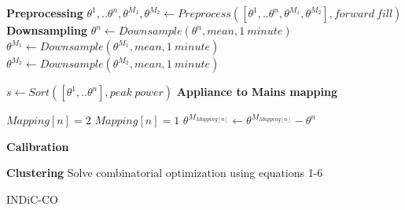 \documentclass[conference]{IEEEtran}
\begin{document}
\begin{algorithm}
\DontPrintSemicolon %
\BlankLine
\textbf{Preprocessing}\;
\BlankLine
\nl$\theta^1,..\theta^n,\theta^{M_1},\theta^{M_2} \gets Preprocess([\theta^1,..\theta^n,\theta^{M_1},\theta^{M_2}],forward\: fill)$\;
\BlankLine
\textbf{Downsampling}
\BlankLine
\nl {}
	{
	$\theta^n \gets Downsample(\theta^n,mean,1\: minute)$\;
	}
\nl $\theta^{M_1} \gets Downsample(\theta^{M_1},mean,1\: minute)$\;
\nl $\theta^{M_2} \gets Downsample(\theta^{M_2},mean,1\: minute)$\;


\nl $s \gets Sort([\theta^1,..\theta^n],peak\: power)$\;
\BlankLine
\textbf{Appliance to Mains mapping}\;
\BlankLine
\nl {}
	{
	
\nl	{} 
		{ $Mapping[n]=2$\;		
		}  
\nl	{}
		{ $Mapping[n]=1$\;
		}
\nl	{}
	\nl	$\theta^{M_{Mapping[n]}} \gets \theta^{M_{Mapping[n]}} - \theta^n $ \;
	}
	\BlankLine
	\textbf{Calibration} \;
	\BlankLine
	
	\BlankLine
	\textbf{Clustering}\;
	\BlankLine
\nl Solve combinatorial optimization using equations 1-6

\nl {}\;
\caption{INDiC-CO}
\label{algo:main}
\end{algorithm}
\end{document}
